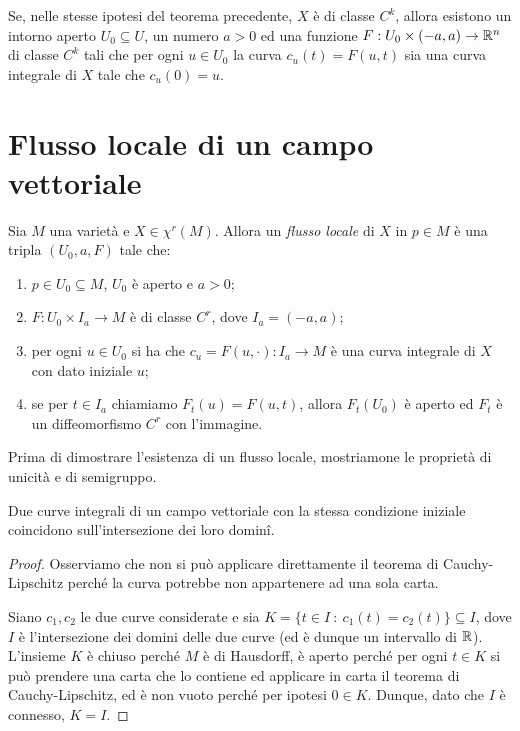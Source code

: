 \begin{theorem} 
	Se, nelle stesse ipotesi del teorema precedente, $X$ è di classe $C^k$, allora esistono un intorno aperto $U_0\subseteq U$, un numero $a>0$ ed una funzione $F:U_0\times (-a,a)\to\mathbb R^n$ di classe $C^k$ tali che per ogni $u\in U_0$ la curva $c_u(t)=F(u,t)$ sia una curva integrale di $X$ tale che $c_u(0)=u$.
\end{theorem}

\section{Flusso locale di un campo vettoriale}

\begin{definition}\label{def:FlussoLocale} 
	Sia $M$ una varietà e $X\in\chi^r(M)$. Allora un \emph{flusso locale} di $X$ in $p\in M$ è una tripla $(U_0,a,F)$ tale che:
	\begin{enumerate}
	\item $p\in U_0\subseteq M$, $U_0$ è aperto e $a>0$; \label{FL:aperto}
	\item $F:U_0\times I_a\to M$ è di classe $C^r$, dove $I_a=(-a,a)$; \label{FL:Cr}
	\item per ogni $u\in U_0$ si ha che $c_u=F(u,\cdot):I_a\to M$ è una curva integrale di $X$ con dato iniziale $u$; \label{FL:curvaintegrale}
	\item se per $t\in I_a$ chiamiamo $F_t(u)=F(u,t)$, allora $F_t(U_0)$ è aperto ed $F_t$ è un diffeomorfismo $C^r$ con l'immagine. \label{FL:diffeo}
	\end{enumerate}
\end{definition}

Prima di dimostrare l'esistenza di un flusso locale, mostriamone le proprietà di unicità e di semigruppo.
 
\begin{proposition} \label{prop:UnicitaCurveIntegrali}
	Due curve integrali di un campo vettoriale con la stessa condizione iniziale coincidono sull'intersezione dei loro dominî.
\end{proposition}

\begin{proof}
	Osserviamo che non si può applicare direttamente il teorema di Cauchy-Lipschitz perché la curva potrebbe non appartenere ad una sola carta.
	
	Siano $c_1,c_2$ le due curve considerate e sia $K=\{ t\in I\ : \ c_1(t)=c_2(t)\}\subseteq I$, dove $I$ è l'intersezione dei domini delle due curve (ed è dunque un intervallo di $\mathbb R$). L'insieme $K$ è chiuso perché $M$ è di Hausdorff, è aperto perché per ogni $t\in K$ si può prendere una carta che lo contiene ed applicare in carta il teorema di Cauchy-Lipschitz, ed è non vuoto perché per ipotesi $0\in K$. Dunque, dato che $I$ è connesso, $K=I$.
\end{proof}

